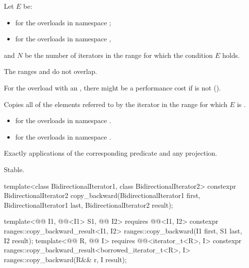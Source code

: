 \begin{itemdescr}
\pnum
Let $E$ be:
\begin{itemize}
\item
  for the overloads in namespace ;
\item
  for the overloads in namespace ,
\end{itemize}
and $N$ be the number of iterators  in the range 
for which the condition $E$ holds.

\pnum
\expects
The ranges  and 
do not overlap.
\begin{note}
For the overload with an ,
there might be a performance cost
if 
is not  ().
\end{note}

\pnum
\effects
Copies all of the elements referred to
by the iterator  in the range 
for which $E$ is .

\pnum
\returns
\begin{itemize}
\item
  for the overloads in namespace .
\item
  for the overloads in namespace .
\end{itemize}

\pnum
\complexity
Exactly  applications
of the corresponding predicate and any projection.

\pnum
\remarks
Stable.
\end{itemdescr}

%
\begin{itemdecl}
template<class BidirectionalIterator1, class BidirectionalIterator2>
  constexpr BidirectionalIterator2
    copy_backward(BidirectionalIterator1 first,
                  BidirectionalIterator1 last,
                  BidirectionalIterator2 result);

template<@@ I1, @@<I1> S1, @@ I2>
  requires @@<I1, I2>
  constexpr ranges::copy_backward_result<I1, I2>
    ranges::copy_backward(I1 first, S1 last, I2 result);
template<@@ R, @@ I>
  requires @@<iterator_t<R>, I>
  constexpr ranges::copy_backward_result<borrowed_iterator_t<R>, I>
    ranges::copy_backward(R&& r, I result);
\end{itemdecl}


